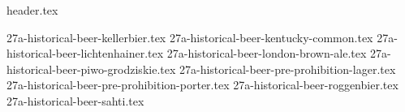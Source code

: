 \clearpage
{}
\divisorLine
{header.tex}
\begin{multicols}{2}
{27a-historical-beer-kellerbier.tex}
{27a-historical-beer-kentucky-common.tex}
{27a-historical-beer-lichtenhainer.tex}
{27a-historical-beer-london-brown-ale.tex}
{27a-historical-beer-piwo-grodziskie.tex}
{27a-historical-beer-pre-prohibition-lager.tex}
{27a-historical-beer-pre-prohibition-porter.tex}
{27a-historical-beer-roggenbier.tex}
{27a-historical-beer-sahti.tex}
\end{multicols}